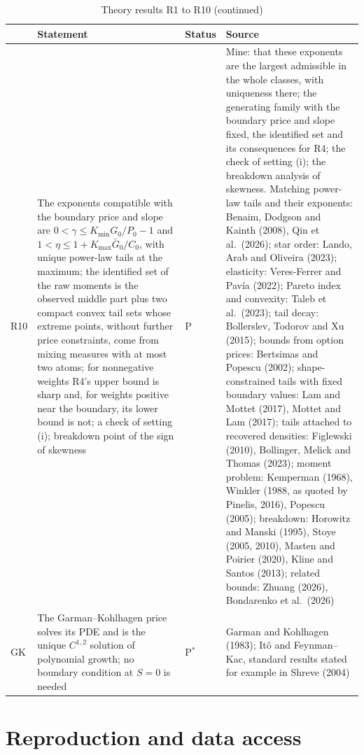\documentclass[11pt]{article}
\theoremstyle{result}
\begin{document}
\clearpage
\addtocounter{table}{-1}
\begin{table}[H]
\centering\footnotesize
\caption{Theory results R1 to R10 (continued)}
\begin{tabularx}{\linewidth}{@{}l>{\raggedright\arraybackslash}X>{\raggedright\arraybackslash}p{1.55cm}>{\raggedright\arraybackslash}X@{}}
\toprule
 & Statement & Status & Source \\
\midrule
R10 & The exponents compatible with the boundary price and slope are $0<\gamma\le K_{\min}G_0/P_0-1$ and $1<\eta\le1+K_{\max}\bar G_0/C_0$, with unique power-law tails at the maximum; the identified set of the raw moments is the observed middle part plus two compact convex tail sets whose extreme points, without further price constraints, come from mixing measures with at most two atoms; for nonnegative weights R4's upper bound is sharp and, for weights positive near the boundary, its lower bound is not; a check of setting (i); breakdown point of the sign of skewness & P & Mine: that these exponents are the largest admissible in the whole classes, with uniqueness there; the generating family with the boundary price and slope fixed, the identified set and its consequences for R4; the check of setting (i); the breakdown analysis of skewness. Matching power-law tails and their exponents: Benaim, Dodgson and Kainth (2008), Qin et al.\ (2026); star order: Lando, Arab and Oliveira (2023); elasticity: Veres-Ferrer and Pav\'ia (2022); Pareto index and convexity: Taleb et al.\ (2023); tail decay: Bollerslev, Todorov and Xu (2015); bounds from option prices: Bertsimas and Popescu (2002); shape-constrained tails with fixed boundary values: Lam and Mottet (2017), Mottet and Lam (2017); tails attached to recovered densities: Figlewski (2010), Bollinger, Melick and Thomas (2023); moment problem: Kemperman (1968), Winkler (1988, as quoted by Pinelis, 2016), Popescu (2005); breakdown: Horowitz and Manski (1995), Stoye (2005, 2010), Masten and Poirier (2020), Kline and Santos (2013); related bounds: Zhuang (2026), Bondarenko et al.\ (2026) \\
GK & The Garman--Kohlhagen price solves its PDE and is the unique $C^{1,2}$ solution of polynomial growth; no boundary condition at $S=0$ is needed & P$^*$ & Garman and Kohlhagen (1983); It\^o and Feynman--Kac, standard results stated for example in Shreve (2004) \\
\bottomrule
\end{tabularx}
\end{table}

\section{Reproduction and data access}\label{app:repro}
\end{document}
